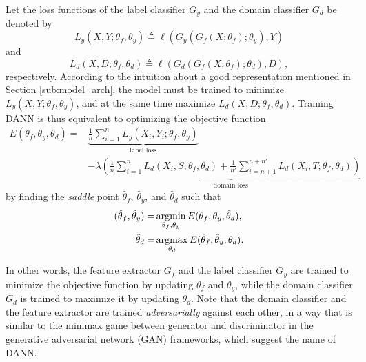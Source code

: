 Let the loss functions of the label classifier $G_y$ and the domain classifier $G_d$ be denoted by
\begin{equation}\label{eq:loss_y}
  L_y(X, Y; \theta_f, \theta_y) \triangleq \ell (G_y(G_f(X; \theta_f); \theta_y), Y)
\end{equation}
and
\begin{equation}\label{eq:loss_d}
  L_d(X, D; \theta_f, \theta_d) \triangleq \ell (G_d(G_f(X; \theta_f); \theta_d), D),
\end{equation}
respectively. According to the intuition about a good representation mentioned in Section \ref{sub:model_arch}, the model must be trained to minimize $L_y(X, Y; \theta_f, \theta_y)$, and at the same time maximize $L_d(X, D; \theta_f, \theta_d)$. Training DANN is thus equivalent to optimizing the objective function
\begin{equation}\label{eq:obj}
  \begin{aligned}
    E(\theta_f, \theta_y, \theta_d)
    =& \underbrace{\frac{1}{n} \sum_{i=1}^{n} L_y(X_i, Y_i; \theta_f, \theta_y)}
       _{\text{label loss}} \\
     & - \lambda \underbrace{(
       \frac{1}{n} \sum_{i=1}^{n} L_d(X_i, S; \theta_f, \theta_d)
       + \frac{1}{n'} \sum_{i=n+1}^{n + n'} L_d(X_i, T; \theta_f, \theta_d))}
       _{\text{domain loss}}
  \end{aligned}
\end{equation}
by finding the \textit{saddle} point $\hat{\theta}_f$, $\hat{\theta}_y$, and $\hat{\theta}_d$ such that
\begin{align}
  (\hat{\theta}_f, \hat{\theta}_y) = & \mathop{\mathrm{argmin}}_{\theta_f, \theta_y} E(\theta_f, \theta_y, \hat{\theta}_d), \label{eq:obj_argmin}\\
  \hat{\theta}_d = & \mathop{\mathrm{argmax}}_{\theta_d} E(\hat{\theta}_f, \hat{\theta}_y, \theta_d). \label{eq:obj_argmax}
\end{align}

In other words, the feature extractor $G_f$ and the label classifier $G_y$ are trained to minimize the objective function by updating $\theta_f$ and $\theta_y$, while the domain classifier $G_d$ is trained to maximize it by updating $\theta_d$. Note that the domain classifier and the feature extractor are trained \textit{adversarially} against each other, in a way that is similar to the minimax game between generator and discriminator in the generative adversarial network (GAN) frameworks, which suggest the name of DANN.


